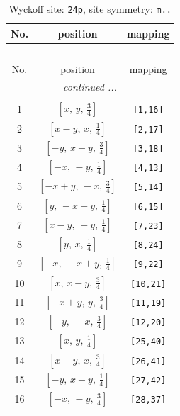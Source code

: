 \documentclass[fleqn,8pt]{jsarticle}
\begin{document}
\renewcommand{\arraystretch}{1.2}
\begin{longtable}{ccc}
\caption{Wyckoff site: {\tt 24p}, site symmetry: {\tt m..}}
 \\
 \hline \hline
No. & position & mapping \\ \hline \endfirsthead

\multicolumn{2}{l}{\tablename\ \thetable{}} \\
 \hline \hline
No. & position & mapping \\ \hline \endhead

 \hline \hline
\multicolumn{2}{r}{\footnotesize\it continued ...} \\ \endfoot

 \hline \hline
\multicolumn{2}{r}{} \\ \endlastfoot

1 & $\left[ x,\, y,\, \frac{3}{4} \right]$ & {\tt [1,16]} \\ \hline
2 & $\left[ x - y,\, x,\, \frac{1}{4} \right]$ & {\tt [2,17]} \\ \hline
3 & $\left[ - y,\, x - y,\, \frac{3}{4} \right]$ & {\tt [3,18]} \\ \hline
4 & $\left[ - x,\, - y,\, \frac{1}{4} \right]$ & {\tt [4,13]} \\ \hline
5 & $\left[ - x + y,\, - x,\, \frac{3}{4} \right]$ & {\tt [5,14]} \\ \hline
6 & $\left[ y,\, - x + y,\, \frac{1}{4} \right]$ & {\tt [6,15]} \\ \hline
7 & $\left[ x - y,\, - y,\, \frac{1}{4} \right]$ & {\tt [7,23]} \\ \hline
8 & $\left[ y,\, x,\, \frac{1}{4} \right]$ & {\tt [8,24]} \\ \hline
9 & $\left[ - x,\, - x + y,\, \frac{1}{4} \right]$ & {\tt [9,22]} \\ \hline
10 & $\left[ x,\, x - y,\, \frac{3}{4} \right]$ & {\tt [10,21]} \\ \hline
11 & $\left[ - x + y,\, y,\, \frac{3}{4} \right]$ & {\tt [11,19]} \\ \hline
12 & $\left[ - y,\, - x,\, \frac{3}{4} \right]$ & {\tt [12,20]} \\ \hline
13 & $\left[ x,\, y,\, \frac{1}{4} \right]$ & {\tt [25,40]} \\ \hline
14 & $\left[ x - y,\, x,\, \frac{3}{4} \right]$ & {\tt [26,41]} \\ \hline
15 & $\left[ - y,\, x - y,\, \frac{1}{4} \right]$ & {\tt [27,42]} \\ \hline
16 & $\left[ - x,\, - y,\, \frac{3}{4} \right]$ & {\tt [28,37]} \\ \hline

\end{longtable}
\end{document}
